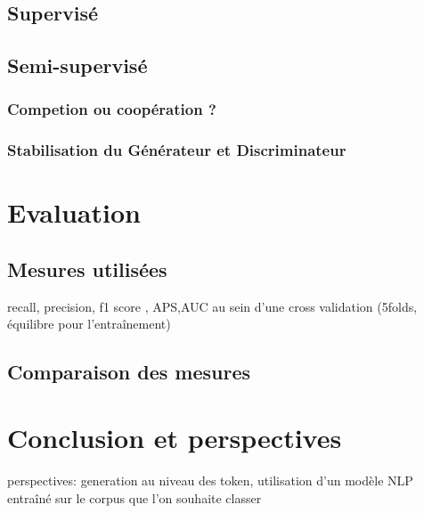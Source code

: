\documentclass[francais,runningheads,a4paper]{llncs}
\begin{document}
	\subsection{Supervisé}

	\subsection{Semi-supervisé}
		\subsubsection{Competion ou coopération ?}
		\subsubsection{Stabilisation du Générateur et Discriminateur}
\section{Evaluation}
\subsection{Mesures utilisées}
recall, precision, f1 score , APS,AUC
au sein d'une cross validation (5folds, équilibre pour l'entraînement)

\subsection{Comparaison des mesures}
	
\section{Conclusion et perspectives}
perspectives:
generation au niveau des token, utilisation d'un modèle NLP entraîné sur le corpus que l'on souhaite classer 
	
\end{document}
